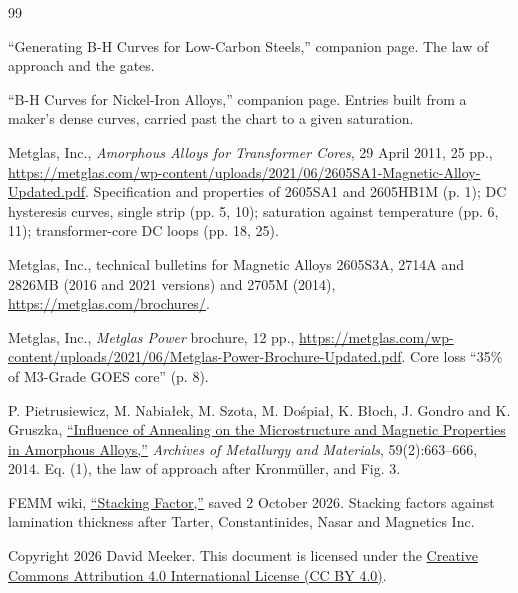 \documentclass[
  11pt,
]{article}
\begin{document}
\begin{thebibliography}{99}\label{references}

 ``Generating B-H Curves for Low-Carbon Steels,'' companion page. The law of approach and the gates.

 ``B-H Curves for Nickel-Iron Alloys,'' companion page. Entries built from a maker's dense curves, carried past the chart to a given saturation.

 Metglas, Inc., \emph{Amorphous Alloys for Transformer Cores}, 29 April 2011, 25 pp., \url{https://metglas.com/wp-content/uploads/2021/06/2605SA1-Magnetic-Alloy-Updated.pdf}. Specification and properties of 2605SA1 and 2605HB1M (p. 1); DC hysteresis curves, single strip (pp. 5, 10); saturation against temperature (pp. 6, 11); transformer-core DC loops (pp. 18, 25).

 Metglas, Inc., technical bulletins for Magnetic Alloys 2605S3A, 2714A and 2826MB (2016 and 2021 versions) and 2705M (2014), \url{https://metglas.com/brochures/}.

 Metglas, Inc., \emph{Metglas Power} brochure, 12 pp., \url{https://metglas.com/wp-content/uploads/2021/06/Metglas-Power-Brochure-Updated.pdf}. Core loss ``35\% of M3-Grade GOES core'' (p. 8).

 P. Pietrusiewicz, M. Nabiałek, M. Szota, M. Dośpiał, K. Błoch, J. Gondro and K. Gruszka, \href{https://doi.org/10.2478/amm-2014-0108}{``Influence of Annealing on the Microstructure and Magnetic Properties in Amorphous Alloys,''} \emph{Archives of Metallurgy and Materials}, 59(2):663--666, 2014. Eq. (1), the law of approach after Kronmüller, and Fig. 3.

 FEMM wiki, \href{https://www.femm.info/doku/doku.php?id=stackingfactor}{``Stacking Factor,''} saved 2 October 2026. Stacking factors against lamination thickness after Tarter, Constantinides, Nasar and Magnetics Inc.

\end{thebibliography}

\noindent Copyright 2026 David Meeker. This document is licensed under the \href{https://creativecommons.org/licenses/by/4.0/}{Creative Commons Attribution 4.0 International License (CC BY 4.0)}.
\end{document}
